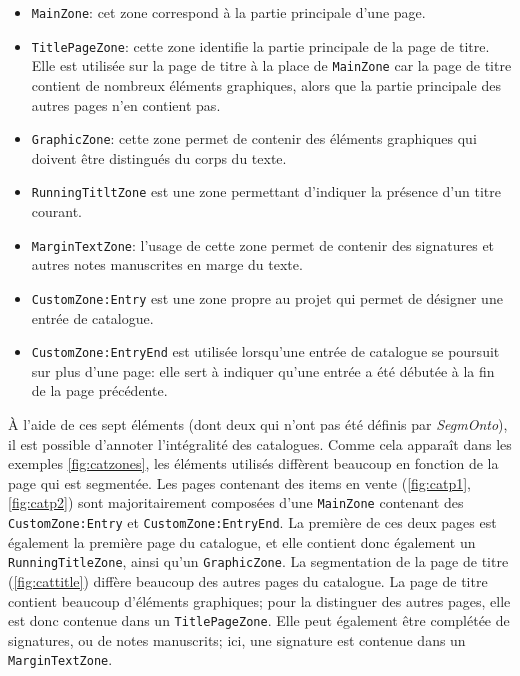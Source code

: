 \begin{itemize}
	\item \texttt{MainZone}: cet zone correspond à la partie principale d'une page.
	\item \texttt{TitlePageZone}: cette zone identifie la partie principale de la page de titre. Elle est utilisée sur la page de titre à la place de \texttt{MainZone} car la page de titre contient de nombreux éléments graphiques, alors que la partie principale des autres pages n'en contient pas.
	\item \texttt{GraphicZone}: cette zone permet de contenir des éléments graphiques qui doivent être distingués du corps du texte.
	\item \texttt{RunningTitltZone} est une zone permettant d'indiquer la présence d'un titre courant.
	\item \texttt{MarginTextZone}: l'usage de cette zone permet de contenir des signatures et autres notes manuscrites en marge du texte.
	\item \texttt{CustomZone:Entry} est une zone propre au projet \mssktb{} qui permet de désigner une entrée de catalogue.
	\item \texttt{CustomZone:EntryEnd} est utilisée lorsqu'une entrée de catalogue se poursuit sur plus d'une page: elle sert à indiquer qu'une entrée a été débutée à la fin de la page précédente.
\end{itemize}

À l'aide de ces sept éléments (dont deux qui n'ont pas été définis par \textit{SegmOnto}), il est possible d'annoter l'intégralité des catalogues. Comme cela apparaît dans les exemples \ref{fig:catzones}, les éléments utilisés diffèrent beaucoup en fonction de la page qui est segmentée. Les pages contenant des items en vente (\ref{fig:catp1}, \ref{fig:catp2}) sont majoritairement composées d'une \texttt{MainZone} contenant des \texttt{CustomZone:Entry} et \texttt{CustomZone:EntryEnd}. La première de ces deux pages est également la première page du catalogue, et elle contient donc également un \texttt{RunningTitleZone}, ainsi qu'un \texttt{GraphicZone}. La segmentation de la page de titre (\ref{fig:cattitle}) diffère beaucoup des autres pages du catalogue. La page de titre contient beaucoup d'éléments graphiques; pour la distinguer des autres pages, elle est donc contenue dans un \texttt{TitlePageZone}. Elle peut également être complétée de signatures, ou de notes manuscrits; ici, une signature est contenue dans un \texttt{MarginTextZone}.

